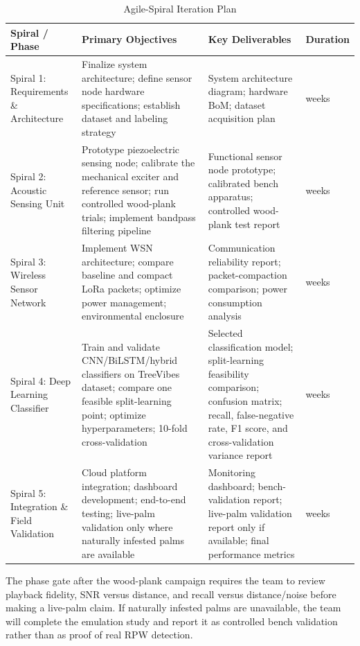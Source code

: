 \documentclass[12pt,a4paper,oneside]{memoir}
\newcommand{\newrevision}[1]{\textcolor{green!45!black}{#1}}
\begin{document}
\begin{table}[h!]
\centering
\caption{Agile-Spiral Iteration Plan}
\label{tab:spiral_plan}
\renewcommand{\arraystretch}{1.3}
\begin{tabular}{>{\raggedright\arraybackslash}p{2.2cm} >{\raggedright\arraybackslash}p{3.8cm} >{\raggedright\arraybackslash}p{3.8cm} >{\raggedright\arraybackslash}p{1.8cm}}
\toprule
\textbf{Spiral / Phase} & \textbf{Primary Objectives} & \textbf{Key Deliverables} & \textbf{Duration} \\
\midrule
Spiral 1: Requirements \& Architecture &
Finalize system architecture; define sensor node hardware specifications; establish dataset and labeling strategy &
System architecture diagram; hardware BoM; dataset acquisition plan &
3 weeks \\
Spiral 2: Acoustic Sensing Unit &
Prototype piezoelectric sensing node; calibrate the mechanical exciter and reference sensor; run controlled wood-plank trials; implement bandpass filtering pipeline &
\newrevision{Functional sensor node prototype; calibrated bench apparatus; controlled wood-plank test report} &
4 weeks \\
Spiral 3: Wireless Sensor Network &
Implement WSN architecture; compare baseline and compact LoRa packets; optimize power management; environmental enclosure &
\newrevision{Communication reliability report; packet-compaction comparison; power consumption analysis} &
4 weeks \\
Spiral 4: Deep Learning Classifier &
Train and validate CNN/BiLSTM/hybrid classifiers on TreeVibes dataset; compare one feasible split-learning point; optimize hyperparameters; 10-fold cross-validation &
\newrevision{Selected classification model; split-learning feasibility comparison; confusion matrix; recall, false-negative rate, F1 score, and cross-validation variance report} &
5 weeks \\
Spiral 5: Integration \& Field Validation &
Cloud platform integration; dashboard development; end-to-end testing; live-palm validation only where naturally infested palms are available &
\newrevision{Monitoring dashboard; bench-validation report; live-palm validation report only if available; final performance metrics} &
4 weeks \\
\bottomrule
\end{tabular}
\end{table}

\newrevision{The phase gate after the wood-plank campaign requires the team to review playback fidelity, SNR versus distance, and recall versus distance/noise before making a live-palm claim. If naturally infested palms are unavailable, the team will complete the emulation study and report it as controlled bench validation rather than as proof of real RPW detection.}
\end{document}
